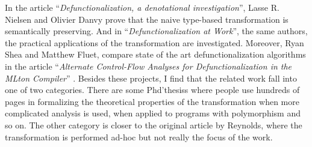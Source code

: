 In the article ``{\it Defunctionalization, a denotational investigation}'',
Lasse R. Nielsen and Olivier Danvy prove that the naive type-based transformation
is semantically preserving. And in ``{\it Defunctionalization at Work}'',
the same authors, the practical applications of the transformation
are investigated.
Moreover,
Ryan Shea and Matthew Fluet, compare state of the art defunctionalization algorithms
in the article
``{\it Alternate Control-Flow Analyses for Defunctionalization in the MLton Compiler}''
.
Besides these projects, I find that the related work fall into one of two categories.
There are some Phd'thesiss where people use hundreds of pages in formalizing the
theoretical properties of the transformation when more complicated analysis
is used, when applied to programs with polymorphism and so on.
The other category is closer to the original article by Reynolds,
where the transformation is performed ad-hoc but not really the focus of the work.
